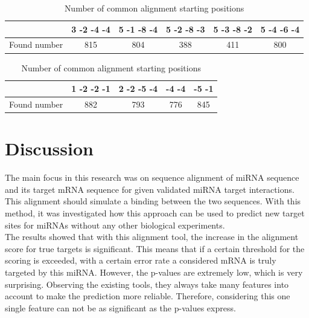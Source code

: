 \documentclass[11pt, a4paper, twoside]{book}
\begin{document}
\begin{table} [h]
\vspace{0.3cm}
\caption{Number of common alignment starting positions}

\begin{tabular}{c||c|c|c|c|c} 
& 3 -2 -4 -4 & 5 -1 -8 -4 & 5 -2 -8 -3 & 5 -3 -8 -2 & 5 -4 -6 -4  \\
\hline\hline
Found number & 815 & 804 & 388 & 411 & 800\\
\hline
\end{tabular}
\vspace{0.5cm}

\begin{tabular}{c||c|c|c|c}
& 1 -2 -2 -1 & 2 -2 -5 -4 & -4 -4 & -5 -1 \\
\hline\hline
Found number & 882 & 793 & 776 & 845  \\
\hline
\end{tabular}
\label{tab:positions}
\end{table}






\chapter{Discussion}
\label{chapter:discussion}

The main focus in this research was on sequence alignment of miRNA sequence and its target mRNA sequence for given validated miRNA target interactions. This alignment should simulate a binding between the two sequences. With this method, it was investigated how this approach can be used to predict new target sites for miRNAs without any other biological experiments.\\

The results showed that with this alignment tool, the increase in the alignment score for true targets is significant. This means that if a certain threshold for the scoring is exceeded, with a certain error rate a considered mRNA is truly targeted by this miRNA. However, the p-values are extremely low, which is very surprising. Observing the existing tools, they always take many features into account to make the prediction more reliable. Therefore, considering this one single feature can not be as significant as the p-values express.\\
\end{document}
